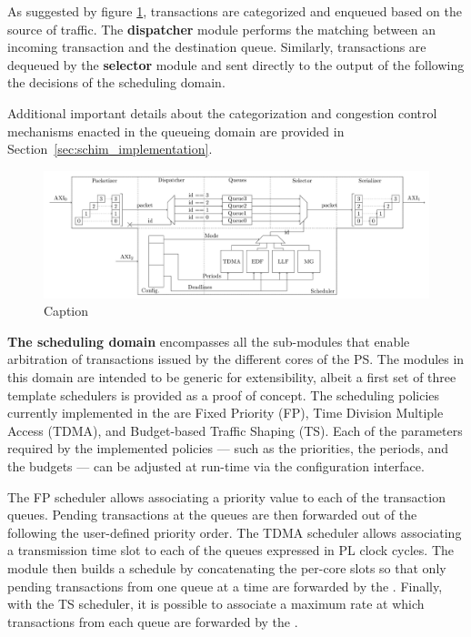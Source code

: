 As suggested by figure \ref{fig:MemorEDF_module_schema}, transactions
are categorized and enqueued based on the source of traffic. The {\bf
  dispatcher} module performs the matching between an incoming
transaction and the destination queue. Similarly, transactions are
dequeued by the {\bf selector} module and sent directly to the output
of the \schim following the decisions of the scheduling
domain.

Additional important details about the categorization and congestion
control mechanisms enacted in the queueing domain are provided in
Section~\ref{sec:schim_implementation}.

\begin{figure}
  \centering
  \includegraphics[scale=0.08]{images/MemorEDF_module_schema.png}
  \caption{Caption}
  \label{fig:MemorEDF_module_schema}
\end{figure}

\par{\bf The scheduling domain} encompasses all the sub-modules that
enable arbitration of transactions issued by the different cores of
the PS. The modules in this domain are intended to be generic for
extensibility, albeit a first set of three template schedulers is
provided as a proof of concept.  The scheduling policies currently
implemented in the \schim are Fixed Priority (FP), Time Division
Multiple Access (TDMA), and Budget-based Traffic Shaping (TS).  Each
of the parameters required by the implemented policies --- such as the
priorities, the periods, and the budgets --- can be adjusted at
run-time via the configuration interface.

The FP scheduler allows associating a priority value to each of the
transaction queues. Pending transactions at the queues are then
forwarded out of the \schim following the user-defined priority
order. The TDMA scheduler allows associating a transmission time slot
to each of the queues expressed in PL clock cycles. The module then
builds a schedule by concatenating the per-core slots so that only
pending transactions from one queue at a time are forwarded by the
\schim. Finally, with the TS scheduler, it is possible to associate a
maximum rate at which transactions from each queue are forwarded by
the \schim. 

